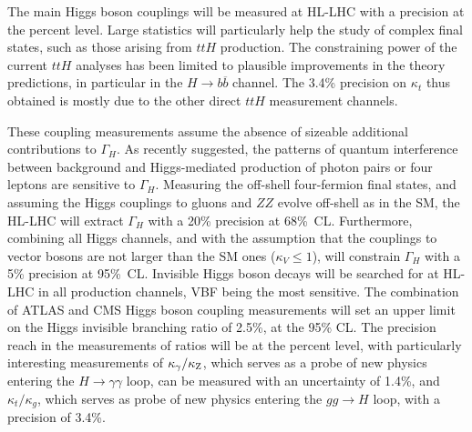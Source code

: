 \documentclass[../report.tex]{subfiles}
\begin{document}
The main Higgs boson couplings will be measured at HL-LHC with a precision at the percent level. Large statistics will particularly help the study of complex final states, such as those arising from $ttH$ production. 
The constraining power of the current $ttH$ analyses has been limited to plausible improvements in the theory predictions, in particular in the $H\rightarrow b\overline{b}$ channel. The 3.4\% precision on $\kappa_t$ thus obtained is mostly due to the other direct $ttH$ measurement channels.


These coupling measurements assume the absence of sizeable additional contributions to $\Gamma_H$. As recently suggested, the patterns of quantum interference between background and Higgs-mediated production of photon pairs or four leptons are sensitive to $\Gamma_H$. Measuring the off-shell four-fermion final states, and assuming the Higgs couplings to gluons and $ZZ$ evolve off-shell as in the SM, the HL-LHC will extract $\Gamma_H$ with a 20\% precision at 68\%~CL.
Furthermore, combining all Higgs channels, and with the assumption that the couplings to vector bosons are not  larger than the SM ones ($\kappa_V\le 1$), will constrain $\Gamma_H$ with a 5\% precision at 95\%~CL. Invisible Higgs boson decays will be searched for at HL-LHC in all production channels, VBF being the most sensitive. The combination of ATLAS and CMS Higgs boson coupling measurements will set an upper limit on the Higgs invisible branching ratio of 2.5\%, at the 95\% CL.  The precision reach in the measurements of ratios will be at the percent level, with particularly interesting measurements of $\kappa_{\gamma}/\kappa_{\rm Z}$, which serves as a probe of new physics entering the $H \rightarrow \gamma\gamma$ loop, can be measured with an uncertainty of 1.4\%, and $\kappa_{t}/\kappa_{g}$, which serves as probe of new physics entering the $gg \rightarrow H$ loop, with a precision of 3.4\%.
\end{document}
